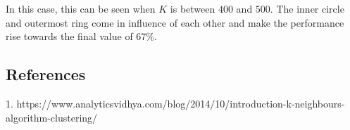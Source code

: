 \documentclass{article}
\begin{document}
In this case, this can be seen when $K$ is between $400$ and $500$. The inner circle and outermost ring come in influence of each other and make the performance rise towards the final value of 67\%.

\clearpage


\subsection{References}
1. https://www.analyticsvidhya.com/blog/2014/10/introduction-k-neighbours-algorithm-clustering/
\clearpage

\end{document}
